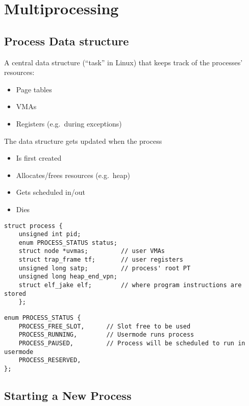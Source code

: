 \section{Multiprocessing}
\subsection{Process Data structure}
A central data structure (``task'' in Linux) that keeps track of the processes' resources:
\begin{itemize}
    \item Page tables
    \item VMAs
    \item Registers (e.g.\ during exceptions)
\end{itemize}
The data structure gets updated when the process
\begin{itemize}
    \item Is first created
    \item Allocates/frees resources (e.g.\ heap)
    \item Gets scheduled in/out
    \item Dies
\end{itemize}

\newpar{}
\begin{lstlisting}[style=bright_C++]
struct process {
    unsigned int pid;
    enum PROCESS_STATUS status; 
    struct node *uvmas;         // user VMAs
    struct trap_frame tf;       // user registers
    unsigned long satp;         // process' root PT
    unsigned long heap_end_vpn;
    struct elf_jake elf;        // where program instructions are stored
    };
\end{lstlisting}
\newpar{}
\begin{lstlisting}[style=bright_C++]
enum PROCESS_STATUS {
    PROCESS_FREE_SLOT, 	    // Slot free to be used
    PROCESS_RUNNING, 	    // Usermode runs process
    PROCESS_PAUSED, 	    // Process will be scheduled to run in usermode
    PROCESS_RESERVED,
};
\end{lstlisting}

\subsection{Starting a New Process}
